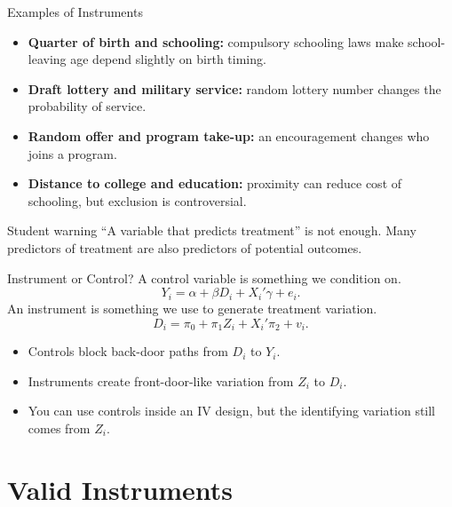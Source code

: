 \documentclass[11pt,aspectratio=169]{beamer}
\begin{document}
\begin{frame}{Examples of Instruments}
  \begin{itemize}
    \item \textbf{Quarter of birth and schooling:} compulsory schooling laws make school-leaving age depend slightly on birth timing.
    \item \textbf{Draft lottery and military service:} random lottery number changes the probability of service.
    \item \textbf{Random offer and program take-up:} an encouragement changes who joins a program.
    \item \textbf{Distance to college and education:} proximity can reduce cost of schooling, but exclusion is controversial.
  \end{itemize}

  \begin{block}{Student warning}
    ``A variable that predicts treatment'' is not enough. Many predictors of treatment are also predictors of potential outcomes.
  \end{block}
\end{frame}

\begin{frame}{Instrument or Control?}
  A control variable is something we condition on.
  \[
    Y_i = \alpha + \beta D_i + X_i'\gamma + e_i.
  \]
  An instrument is something we use to generate treatment variation.
  \[
    D_i = \pi_0 + \pi_1 Z_i + X_i'\pi_2 + v_i.
  \]

  \begin{itemize}
    \item Controls block back-door paths from \(D_i\) to \(Y_i\).
    \item Instruments create front-door-like variation from \(Z_i\) to \(D_i\).
    \item You can use controls inside an IV design, but the identifying variation still comes from \(Z_i\).
  \end{itemize}
\end{frame}

\section{Valid Instruments}
\end{document}

